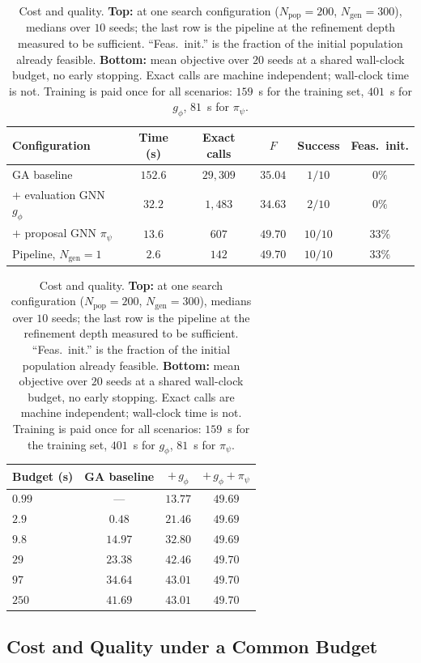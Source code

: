 \documentclass[journal,a4paper,comsoc,twocolumn]{IEEEtran}
\newcommand{\Npop}{N_{\mathrm{pop}}}
\newcommand{\Ngen}{N_{\mathrm{gen}}}
\begin{document}
\begin{table}[!t]
\centering
\caption{Cost and quality. \textbf{Top:} at one search configuration
($\Npop = 200$, $\Ngen = 300$), medians over $10$ seeds; the last row is the
pipeline at the refinement depth measured to be sufficient. ``Feas.\ init.'' is
the fraction of the initial population already feasible. \textbf{Bottom:} mean
objective over $20$ seeds at a shared wall-clock budget, no early stopping.
Exact calls are machine independent; wall-clock time is not. Training is paid
once for all scenarios: $159$~s for the training set, $401$~s for $g_\phi$,
$81$~s for $\pi_\psi$.}
\label{tab:cost}
\small
\setlength{\tabcolsep}{3pt}
\begin{tabular}{lccccc}
\toprule
Configuration & Time (s) & Exact calls & $F$ & Success & Feas.\ init. \\
\midrule
GA baseline~\cite{Yi2025} & $152.6$ & $29{,}309$ & $35.04$ & $1/10$ & $0\%$ \\
\;\; $+$ evaluation GNN $g_\phi$ & $32.2$ & $1{,}483$ & $34.63$ & $2/10$ & $0\%$ \\
\;\; $+$ proposal GNN $\pi_\psi$ & $13.6$ & $607$ & $49.70$ & $10/10$ & $33\%$ \\
\midrule
Pipeline, $\Ngen = 1$ & $2.6$ & $142$ & $49.70$ & $10/10$ & $33\%$ \\
\bottomrule
\end{tabular}

\vspace{2pt}

\begin{tabular}{lccc}
\toprule
Budget (s) & GA baseline & $+\,g_\phi$ & $+\,g_\phi+\pi_\psi$ \\
\midrule
$0.99$ & --- & $13.77$ & $49.69$ \\
$2.9$ & $0.48$ & $21.46$ & $49.69$ \\
$9.8$ & $14.97$ & $32.80$ & $49.69$ \\
$29$ & $23.38$ & $42.46$ & $49.70$ \\
$97$ & $34.64$ & $43.01$ & $49.70$ \\
$250$ & $41.69$ & $43.01$ & $49.70$ \\
\bottomrule
\end{tabular}
\end{table}

\subsection{Cost and Quality under a Common Budget}
\label{sec:cost}
\end{document}
